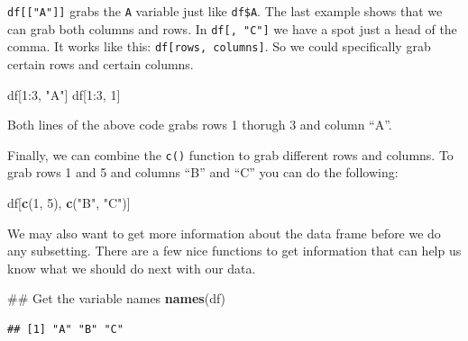 \documentclass[]{tufte-book}
\newenvironment{Shaded}{}{}
\newcommand{\KeywordTok}[1]{\textcolor[rgb]{0.00,0.44,0.13}{\textbf{#1}}}
\newcommand{\DecValTok}[1]{\textcolor[rgb]{0.25,0.63,0.44}{#1}}
\newcommand{\StringTok}[1]{\textcolor[rgb]{0.25,0.44,0.63}{#1}}
\newcommand{\OperatorTok}[1]{\textcolor[rgb]{0.40,0.40,0.40}{#1}}
\newcommand{\NormalTok}[1]{#1}
\theoremstyle{definition}
\theoremstyle{definition}
\theoremstyle{remark}
\begin{document}
\texttt{df{[}{[}"A"{]}{]}} grabs the \texttt{A} variable just like
\texttt{df\$A}. The last example shows that we can grab both columns and
rows. In \texttt{df{[},\ "C"{]}} we have a spot just a head of the
comma. It works like this: \texttt{df{[}rows,\ columns{]}}. So we could
specifically grab certain rows and certain columns.

\begin{Shaded}
\begin{Highlighting}[]
\NormalTok{df[}\DecValTok{1}\OperatorTok{:}\DecValTok{3}\NormalTok{, }\StringTok{"A"}\NormalTok{]}
\NormalTok{df[}\DecValTok{1}\OperatorTok{:}\DecValTok{3}\NormalTok{, }\DecValTok{1}\NormalTok{]}
\end{Highlighting}
\end{Shaded}

Both lines of the above code grabs rows 1 thorugh 3 and column ``A''.

Finally, we can combine the \texttt{c()} function to grab different rows
and columns. To grab rows 1 and 5 and columns ``B'' and ``C'' you can do
the following:

\begin{Shaded}
\begin{Highlighting}[]
\NormalTok{df[}\KeywordTok{c}\NormalTok{(}\DecValTok{1}\NormalTok{, }\DecValTok{5}\NormalTok{), }\KeywordTok{c}\NormalTok{(}\StringTok{"B"}\NormalTok{, }\StringTok{"C"}\NormalTok{)]}
\end{Highlighting}
\end{Shaded}

We may also want to get more information about the data frame before we
do any subsetting. There are a few nice functions to get information
that can help us know what we should do next with our data.

\begin{Shaded}
\begin{Highlighting}[]
\NormalTok{## Get the variable names}
\KeywordTok{names}\NormalTok{(df)}
\end{Highlighting}
\end{Shaded}

\begin{verbatim}
## [1] "A" "B" "C"
\end{verbatim}

\begin{Shaded}
\end{Shaded}
\end{document}
